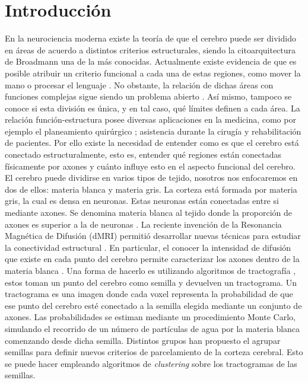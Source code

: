\chapter{Introducci\'on}

En la neurociencia moderna existe la teor\'ia de que el cerebro
puede ser dividido en \'areas de acuerdo a distintos criterios
estructurales, siendo la citoarquitectura de Broadmann \cite{Brodmann1909}
una de la m\'as conocidas. Actualmente existe evidencia de que es posible
atribuir un criterio funcional a cada una de estas regiones, como mover la
mano o procesar el lenguaje \cite{Greicius2003}. No obstante, la relaci\'on
de dichas \'areas con funciones complejas sigue siendo un problema
abierto \cite{Barch2013}. As\'i mismo, tampoco se conoce si esta divisi\'on
es \'unica, y en tal caso, qu\'e l\'imites definen a cada \'area. La
relaci\'on funci\'on-estructura posee diversas aplicaciones en la
medicina, como por ejemplo el planeamiento quir\'urgico 
\cite{Stufflebeam2011} \cite{Oishi2010}; asistencia durante la cirug\'ia
\cite{DeSchotten2005} y rehabilitaci\'on \cite{Song2014} de pacientes. 
Por ello existe la necesidad de entender como es que el cerebro est\'a
conectado estructuralmente, esto es, entender qu\'e regiones est\'an
conectadas f\'isicamente por axones y cu\'anto influye esto en el aspecto
funcional del cerebro. \\

El cerebro puede dividirse en varios tipos de tejido, nosotros nos
enfocaremos en dos de ellos: materia blanca y materia gris. La corteza 
est\'a formada por materia gris, la cual es densa en neuronas. Estas
neuronas est\'an conectadas entre si mediante axones. Se denomina materia
blanca al tejido donde la proporci\'on de axones es superior a la de
neuronas \cite{Dale2008}. La reciente invenci\'on de la Resonancia 
Magn\'etica de Difusi\'on (dMRI) permiti\'o desarrollar nuevas t\'ecnicas
para estudiar la conectividad estructural \cite{Taylor1985}. En
particular, el conocer la intensidad de difusi\'on que existe en cada
punto del cerebro permite caracterizar los axones dentro de la materia
blanca \cite{Hagmann2006}. Una forma de hacerlo es utilizando algoritmos
de tractograf\'ia \cite{Descoteaux2009, Jbabdi2007}, estos toman un
punto del cerebro como semilla y devuelven un tractograma. Un tractograma
es una imagen donde cada voxel representa la probabilidad de que ese punto
del cerebro est\'e conectado a la semilla elegida mediante un conjunto de
axones. Las probabilidades se estiman mediante un procedimiento Monte
Carlo, simulando el recorrido de un n\'umero de part\'iculas de agua por
la materia blanca comenzando desde dicha semilla. Distintos grupos han
propuesto el agrupar semillas para definir nuevos criterios de
parcelamiento de la corteza cerebral. Esto se puede hacer empleando algoritmos de \textit{clustering} sobre los tractogramas de las semillas.\\

